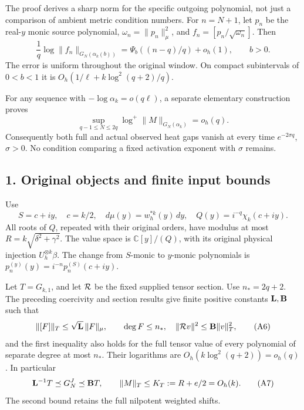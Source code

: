 \documentclass[11pt]{article}
\begin{document}
The proof derives a sharp norm for the specific outgoing polynomial, not just a comparison of ambient metric condition numbers. For \(n=N+1\), let \(p_n\) be the real-\(y\) monic source polynomial, \(\omega_n=\|p_n\|_\mu^2\), and \(f_n=[p_n/\sqrt{\omega_n}]\). Then \[
 \frac1q\log\|f_n\|_{G_N(\alpha_k(b))}
   =\Psi_b((n-q)/q)+o_h(1),\qquad b>0.
 \tag{A4}
\] The error is uniform throughout the original window. On compact subintervals of \(0<b<1\) it is \(O_h(1/\ell+k\log^2(q+2)/q)\).

For any sequence with \(-\log\alpha_k=o(q\ell)\), a separate elementary construction proves \[
 \sup_{q-1\le N\le2q}\log^+\|M\|_{G_N(\alpha_k)}=o_h(q).
 \tag{A5}
\] Consequently both full and actual observed heat gaps vanish at every time \(e^{-2\sigma q}\), \(\sigma>0\). No condition comparing a fixed activation exponent with \(\sigma\) remains.

\subsection{1. Original objects and finite input bounds}\label{original-objects-and-finite-input-bounds}

Use \[
 S=c+iy,\quad c=k/2,\quad
 d\mu(y)=w_h^{*k}(y)\,dy,\quad
 Q(y)=i^{-q}\chi_k(c+iy).
\] All roots of \(Q\), repeated with their original orders, have modulus at most \(R=k\sqrt{\delta^2+\gamma^2}\). The value space is \(\mathbb C[y]/(Q)\), with its original physical injection \(U_h^{\otimes k}\beta\). The change from \(S\)-monic to \(y\)-monic polynomials is \(p_n^{(y)}(y)=i^{-n}p_n^{(S)}(c+iy)\).

Let \(T=G_{k,1}\), and let \({\cal R}\) be the fixed supplied tensor section. Use \(n_*=2q+2\). The preceding coercivity and section results give finite positive constants \({\bf L},{\bf B}\) such that \[
 \|[F]\|_T\le\sqrt{\bf L}\,\|F\|_\mu,\qquad \deg F\le n_*,
 \quad
 \|{\cal R}v\|^2\le{\bf B}\|v\|_T^2,
 \tag{A6}
\] and the first inequality also holds for the full tensor value of every polynomial of separate degree at most \(n_*\). Their logarithms are \(O_h(k\log^2(q+2))=o_h(q)\). In particular \[
 {\bf L}^{-1}T\preceq G_N^J\preceq{\bf B}T,\qquad
 \|M\|_T\le K_T:=R+e/2=O_h(k).
 \tag{A7}
\] The second bound retains the full nilpotent weighted shifts.
\end{document}
